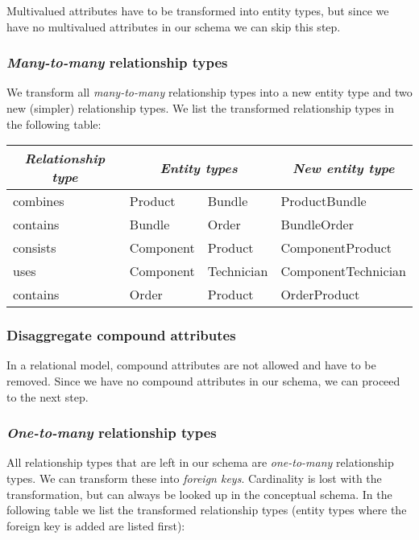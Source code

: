 \documentclass[11pt]{article}
\begin{document}
Multivalued attributes have to be transformed into entity types, but since we have no multivalued attributes in our schema we can skip this step.


\subsubsection*{\emph{Many-to-many} relationship types}

We transform all \emph{many-to-many} relationship types into a new entity type and two new (simpler) relationship types. We list the transformed relationship types in the following table:

\begin{tabular}[t]{*{4}{l}}
\hline
\multicolumn{1}{c|}{\emph{Relationship type}}     &
\multicolumn{2}{c|}{\emph{Entity types}}          &
\multicolumn{1}{c}{\emph{New entity type}}        \\
\hline
combines & Product   & Bundle     & ProductBundle       \\
contains & Bundle    & Order      & BundleOrder         \\
consists & Component & Product    & ComponentProduct    \\
uses     & Component & Technician & ComponentTechnician \\
contains & Order     & Product    & OrderProduct        \\
\hline
\end{tabular}


\subsubsection*{Disaggregate compound attributes}

In a relational model, compound attributes are not allowed and have to be removed. Since we have no compound attributes in our schema, we can proceed to the next step.


\subsubsection*{\emph{One-to-many} relationship types}

All relationship types that are left in our schema are \emph{one-to-many} relationship types. We can transform these into \emph{foreign keys}. Cardinality is lost with the transformation, but can always be looked up in the conceptual schema. In the following table we list the transformed relationship types (entity types where the foreign key is added are listed first):
\end{document}
